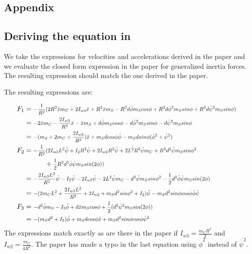 \documentclass[a4paper,10pt]{article}
\newcommand\scalemath[2]{\scalebox{#1}{\mbox{\ensuremath{\displaystyle #2}}}}
\begin{document}
\begin{itemize}
\section{Appendix}
\subsection{Deriving the equation in \cite{kim2005dynamic}}
We take the expressions for velocities and accelerations derived in the paper and we evaluate the closed form
expression in the paper for generalized inertia forces. The resulting expression should match the one derived 
in the paper.



The resulting expressions are:

\begin{align}
 F_1 &= \scalemath{0.8}{-\frac{1}{R^2}(2R^2\ddot{x}m_C + 2I_{w3}\ddot{x} + R^2\ddot{x}m_S - R^2d\ddot{\phi}m_Scos\phi + R^2d\dot{\phi}^2m_Ssin\phi + R^2d\dot{\psi}^2m_Ssin\phi)} \nonumber \\
     &= \scalemath{0.8}{-2\ddot{x}m_C - \frac{2I_{w3}}{R^2}\ddot{x} - \ddot{x}m_S + d\ddot{\phi}m_Scos\phi - d\dot{\phi}^2m_Ssin\phi - d\dot{\psi}^2m_Ssin\phi} \nonumber \\
     &= \scalemath{0.8}{-(m_S + 2m_C + \frac{2I_{w3}}{R^2})\ddot{x} + m_Sdcos\phi\ddot{\phi} - m_Sdsin\phi(\dot{\phi}^2 + \dot{\psi}^2)} \nonumber \\
 F_2 &= \scalemath{0.8}{-\frac{1}{R^2}(2I_{w3}L^2\ddot{\psi} + I_2R^2\ddot{\psi} + 2I_{w2}R^2\ddot{\psi} + 2L^2R^2\ddot{\psi}m_C + R^2d^2\ddot{\psi}m_Ssin\phi^2} \nonumber \\ 
         & \hskip 3em + \scalemath{0.8}{\frac{1}{2}R^2d^2\dot{\phi}\dot{\psi}m_Ssin(2\phi))} \nonumber \\
     &= \scalemath{0.8}{-\frac{2I_{w3}L^2}{R^2}\ddot{\psi} - I_2\ddot{\psi} - 2I_{w2}\ddot{\psi} - 2L^2\ddot{\psi}m_C - d^2\ddot{\psi}m_Ssin\phi^2 - \frac{1}{2}d^2\dot{\phi}\dot{\psi}m_Ssin(2\phi)} \nonumber \\
     &= \scalemath{0.8}{-(2m_CL^2 +\frac{2I_{w3}L^2}{R^2} + 2I_{w2} + m_Sd^2sin\phi^2 + I_2 )\ddot{\psi} - m_Sd^2sin\phi cos\phi\dot{\phi}\dot{\psi}} \nonumber \\
 F_3 &= \scalemath{0.8}{-d^2\ddot{\phi}m_S - I_3\ddot{\phi} + d\ddot{x}m_Scos\phi + \frac{1}{2}(d^2\dot{\psi}^2m_Ssin(2\phi))} \nonumber \\
     &= \scalemath{0.8}{-(m_Sd^2 + I_3)\ddot{\phi} + m_Sdcos\phi\ddot{x} + m_Sd^2sin\phi cos\phi\dot{\psi}^2} \nonumber  
\end{align}
The expressions match exactly as are there in the paper if $I_{w3} = \frac{m_CR^2}{2}$ and $I_{w2} = \frac{m_C}{4R^2}$.
The paper has made a typo in the last equation using $\dot{\phi}^2$ instead of $\dot{\psi}^2$. 





\end{itemize}
\end{document}
